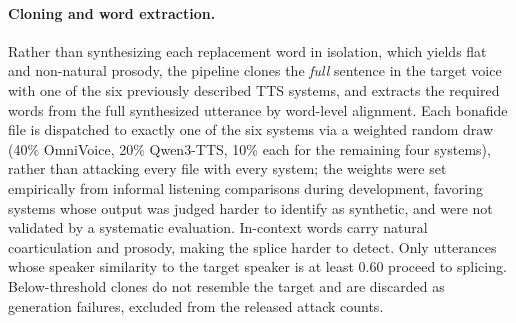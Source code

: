 \documentclass[11pt]{report}
\begin{document}
\paragraph{Cloning and word extraction.} Rather than synthesizing each
replacement word in isolation, which yields flat and non-natural
prosody, the pipeline clones the \emph{full} sentence in the target voice
with one of the six previously described TTS systems, and extracts the
required words from the full synthesized utterance by word-level
alignment. Each bonafide file is dispatched to exactly one of the six
systems via a weighted random draw (40\% OmniVoice, 20\% Qwen3-TTS,
10\% each for the remaining four systems), rather than attacking every
file with every system; the weights were set empirically from informal
listening comparisons during development, favoring systems whose
output was judged harder to identify as synthetic, and were not
validated by a systematic evaluation. In-context words carry natural coarticulation and prosody,
making the splice harder to detect. Only utterances whose speaker
similarity to the target speaker is at least 0.60 proceed to splicing.
Below-threshold clones do not resemble the target and are discarded as
generation failures, excluded from the released attack counts.
\end{document}
